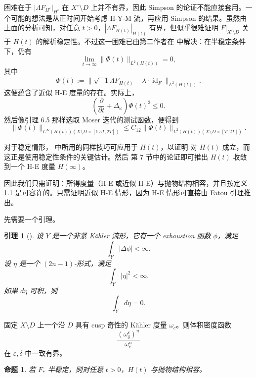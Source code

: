 \documentclass[12pt,a4paper]{article}
\newtheorem{lemma}[theorem]{引理}
\newtheorem{proposition}[theorem]{命题}
\newcommand{\Id}{\operatorname{id}}
\begin{document}
困难在于 \(|\Lambda F_{H^\varepsilon}|_{H^\varepsilon}\) 在 \(X^\circ\setminus D\) 上并不有界，因此 Simpson \cite{SimpsonConstruct} 的论证不能直接套用。一个可能的想法是从正时间开始考虑 H-Y-M 流，再应用 Simpson 的结果。虽然由上面的分析可知，对任意 \(t>0\)，\(|\Lambda F_{H(t)}|_{H(t)}\) 有界，但似乎很难证明 \(F|_{X^\circ\setminus D}\) 关于 \(H(t)\) 的解析稳定性。不过这一困难已由第二作者在 \cite[Proposition 4.1]{LiZhangZhang} 中解决：在半稳定条件下，仍有
\[
\lim_{t\to\infty}\|\Phi(t)\|_{L^2(H(t))}=0,
\]
其中
\[
\Phi(t):=\|\sqrt{-1}\Lambda F_{H(t)}-\lambda\cdot \Id_F\|_{L^2(H(t))}.
\]
这便蕴含了近似 H-E 度量的存在。实际上，
\[
\left(\frac{\partial}{\partial t}+\Delta_\omega\right)\Phi(t)^2\le 0.
\]
然后像引理 6.5 那样选取 Moser 迭代的测试函数，便得到
\[
\|\Phi(t)\|_{L^\infty(H(t))(X\setminus D\times [1.5T,2T])}
\le
C_{12}\|\Phi(t)\|_{L^2(H(t))(X\setminus D\times [T,2T])}.
\]

对于稳定情形，\cite[Proposition 4.1]{LiZhangZhang} 中所用的同样技巧可应用于 \(H(t)\)，以证明 \cite[Proposition 5.3]{SimpsonConstruct} 对 \(H(t)\) 成立，而这正是使用稳定性条件的关键估计。然后 \cite{SimpsonConstruct} 第 7 节中的论证即可推出 \(H(t)\) 收敛到一个 H-E 度量 \(H(\infty)\)。

因此我们只需证明：所得度量（H-E 或近似 H-E）与抛物结构相容，并且按定义 1.1 是可容许的。只需证明近似 H-E 情形，因为 H-E 情形可直接由 Fatou 引理推出。

先需要一个引理。

\begin{lemma}[{\cite[Lemma 5.2]{SimpsonConstruct}}]
设 \(Y\) 是一个非紧 Kähler 流形，它有一个 exhaustion 函数 \(\phi\)，满足
\[
\int_Y |\Delta \phi|<\infty.
\]
设 \(\eta\) 是一个 \((2n-1)\)-形式，满足
\[
\int_Y |\eta|^2<\infty.
\]
如果 \(d\eta\) 可积，则
\[
\int_Y d\eta=0.
\]
\end{lemma}

固定 \(X\setminus D\) 上一个沿 \(D\) 具有 cusp 奇性的 Kähler 度量 \(\omega_c\)。则体积密度函数
\[
\frac{(\omega^\varepsilon_\delta)^n}{\omega_c^n}
\]
在 \(\varepsilon,\delta\) 中一致有界。

\begin{proposition}
若 \(F_*\) 半稳定，则对任意 \(t>0\)，\(H(t)\) 与抛物结构相容。
\end{proposition}
\end{document}

